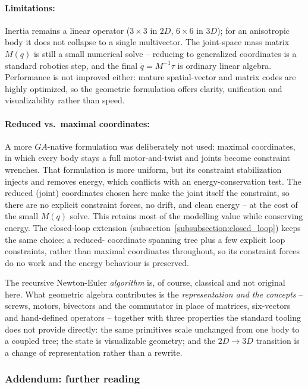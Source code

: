 \paragraph{Limitations:} Inertia remains a linear operator ($3\times3$ in $2D$, $6\times6$
in $3D$); for an
anisotropic body it does not collapse to a single multivector. The joint-space mass matrix
$M(q)$ is still a small numerical solve -- reducing to generalized coordinates is a
standard robotics step, and the final $\ddot{q} = M^{-1}\tau$ is ordinary linear algebra.
Performance is not improved either: mature spatial-vector and matrix codes are highly
optimized, so the geometric formulation offers clarity, unification and visualizability
rather than speed.

\paragraph{Reduced vs.\ maximal coordinates:} A more $GA$-native formulation was
deliberately not used: maximal
coordinates, in which every body stays a full motor-and-twist and joints become constraint
wrenches. That formulation is more uniform, but its constraint stabilization
injects and removes energy, which conflicts with an energy-conservation test. The reduced
(joint) coordinates chosen here make the joint itself the constraint, so there are no
explicit constraint forces, no drift, and clean energy -- at the cost of the small $M(q)$
solve. This retains most of the modelling value while conserving energy. The closed-loop
extension (subsection~\ref{subsubsection:closed_loop}) keeps the same choice: a reduced-
coordinate spanning tree plus a few explicit loop constraints, rather than maximal
coordinates throughout, so its constraint forces do no work and the energy behaviour is
preserved.

The recursive Newton-Euler \emph{algorithm} is, of course, classical and not original
here. What geometric algebra contributes is the \emph{representation and the concepts} --
screws, motors, bivectors and the commutator in place of matrices, six-vectors and
hand-defined operators -- together with three properties the standard tooling does not
provide directly: the same primitives scale unchanged from one body to a coupled tree; the
state is visualizable geometry; and the $2D \to 3D$ transition is a change of
representation rather than a rewrite.


\subsubsection{Addendum: further reading}
\label{subsubsection:addendum_further_reading}

